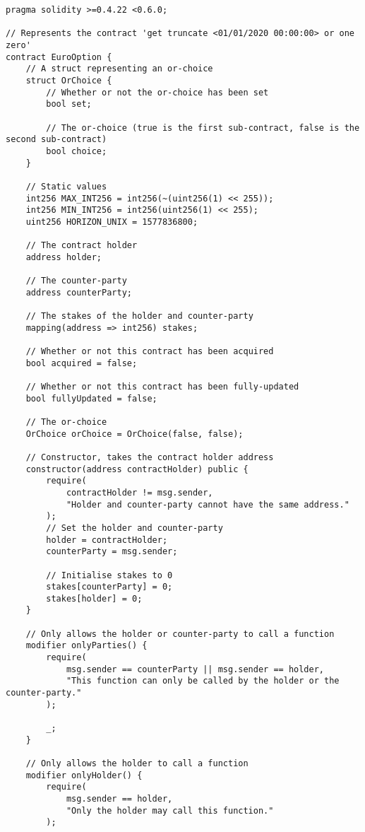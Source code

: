 \begin{lstlisting}[language=Solidity, caption={A Solidity smart contract for the \textit{European option} contract case study in section \ref{case-studies}.}, captionpos=b, breaklines=true, postbreak=\mbox{\textcolor{red}{$\hookrightarrow$}\space}]
pragma solidity >=0.4.22 <0.6.0;

// Represents the contract 'get truncate <01/01/2020 00:00:00> or one zero'
contract EuroOption {
    // A struct representing an or-choice
    struct OrChoice {
        // Whether or not the or-choice has been set
        bool set;

        // The or-choice (true is the first sub-contract, false is the second sub-contract)
        bool choice;
    }

    // Static values
    int256 MAX_INT256 = int256(~(uint256(1) << 255));
    int256 MIN_INT256 = int256(uint256(1) << 255);
    uint256 HORIZON_UNIX = 1577836800;

    // The contract holder
    address holder;

    // The counter-party
    address counterParty;

    // The stakes of the holder and counter-party
    mapping(address => int256) stakes;

    // Whether or not this contract has been acquired
    bool acquired = false;

    // Whether or not this contract has been fully-updated
    bool fullyUpdated = false;

    // The or-choice
    OrChoice orChoice = OrChoice(false, false);

    // Constructor, takes the contract holder address
    constructor(address contractHolder) public {
        require(
            contractHolder != msg.sender,
            "Holder and counter-party cannot have the same address."
        );
        // Set the holder and counter-party
        holder = contractHolder;
        counterParty = msg.sender;

        // Initialise stakes to 0
        stakes[counterParty] = 0;
        stakes[holder] = 0;
    }

    // Only allows the holder or counter-party to call a function
    modifier onlyParties() {
        require(
            msg.sender == counterParty || msg.sender == holder,
            "This function can only be called by the holder or the counter-party."
        );

        _;
    }

    // Only allows the holder to call a function
    modifier onlyHolder() {
        require(
            msg.sender == holder,
            "Only the holder may call this function."
        );


\end{lstlisting}

